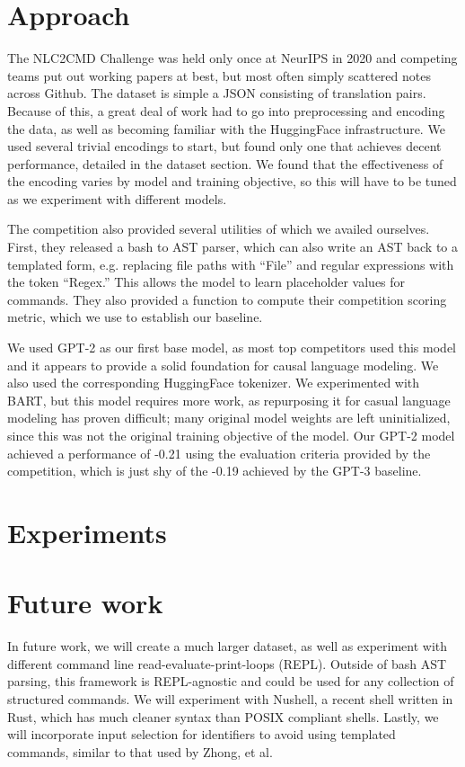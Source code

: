 \documentclass{article}
\begin{document}
\section{Approach}
The NLC2CMD Challenge was held only once at NeurIPS in 2020 and competing teams
put out working papers at best, but most often simply scattered notes across
Github. The dataset is simple a JSON consisting of translation pairs. Because
of this, a great deal of work had to go into preprocessing and encoding the
data, as well as becoming familiar with the HuggingFace infrastructure. We used
several trivial encodings to start, but found only one that achieves decent
performance, detailed in the dataset section. We found that the effectiveness
of the encoding varies by model and training objective, so this will have to be
tuned as we experiment with different models.
\par
The competition also provided several utilities of which we availed ourselves.
First, they released a bash to AST parser, which can also write an AST back to
a templated form, e.g. replacing file paths with ``File'' and regular
expressions with the token ``Regex.'' This allows the model to learn
placeholder values for commands. They also provided a function to compute their
competition scoring metric, which we use to establish our baseline.
\par
We used GPT-2 as our first base model, as most top competitors used this model
and it appears to provide a solid foundation for causal language modeling. We
also used the corresponding HuggingFace tokenizer. We experimented with BART,
but this model requires more work, as repurposing it for casual language
modeling has proven difficult; many original model weights are left
uninitialized, since this was not the original training objective of the model.
Our GPT-2 model achieved a performance of -0.21 using the evaluation criteria
provided by the competition, which is just shy of the -0.19 achieved by the
GPT-3 baseline.
\par

\section{Experiments}


\section{Future work}
In future work, we will create a much larger dataset, as well as experiment
with different command line read-evaluate-print-loops (REPL). Outside of bash
AST parsing, this framework is REPL-agnostic and could be used for any
collection of structured commands. We will experiment with Nushell, a
recent shell written in Rust, which has much cleaner syntax than POSIX
compliant shells. Lastly, we will incorporate input selection for identifiers
to avoid using templated commands, similar to that used by Zhong, et
al\cite{zhong2017seq2sql}.




\end{document}

